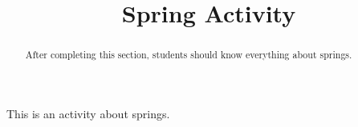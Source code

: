 \documentclass{ximera}
\title{Spring Activity}
\begin{document}
\begin{abstract}
After completing this section, students should know everything about springs.
\end{abstract}


\maketitle

This is an activity about springs.
\end{document}
